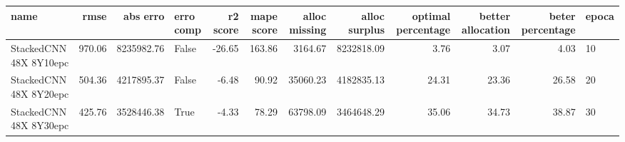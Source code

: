 \begin{tabular}{lrrlrrrrrrrl}
\toprule
name & rmse & abs erro & erro comp & r2 score & mape score & alloc missing & alloc surplus & optimal percentage & better allocation & beter percentage & epoca \\
\midrule
StackedCNN 48X 8Y10epc & 970.06 & 8235982.76 & False & -26.65 & 163.86 & 3164.67 & 8232818.09 & 3.76 & 3.07 & 4.03 & 10 \\
StackedCNN 48X 8Y20epc & 504.36 & 4217895.37 & False & -6.48 & 90.92 & 35060.23 & 4182835.13 & 24.31 & 23.36 & 26.58 & 20 \\
StackedCNN 48X 8Y30epc & 425.76 & 3528446.38 & True & -4.33 & 78.29 & 63798.09 & 3464648.29 & 35.06 & 34.73 & 38.87 & 30 \\
\bottomrule
\end{tabular}
